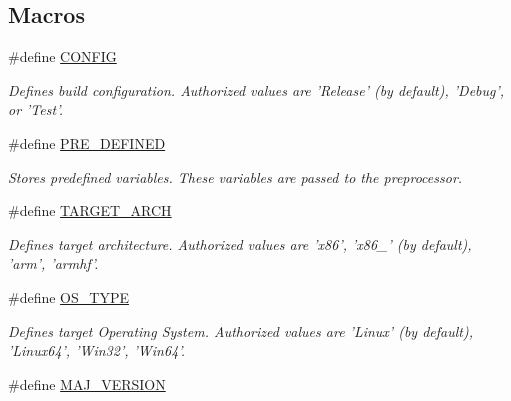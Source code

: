 \subsection*{Macros}
\begin{DoxyCompactItemize}
\item 
\hypertarget{group___build___variables_ga76ea3cf49247a07c54b3db005a3c7f57}{\#define \hyperlink{group___build___variables_ga76ea3cf49247a07c54b3db005a3c7f57}{C\+O\+N\+F\+I\+G}}\label{group___build___variables_ga76ea3cf49247a07c54b3db005a3c7f57}

\begin{DoxyCompactList}\small\item\em Defines build configuration. Authorized values are 'Release' (by default), 'Debug', or 'Test'. \end{DoxyCompactList}\item 
\hypertarget{group___build___variables_gab6ba1c81d5eb93f6cbcd77db8797b5ad}{\#define \hyperlink{group___build___variables_gab6ba1c81d5eb93f6cbcd77db8797b5ad}{P\+R\+E\+\_\+\+D\+E\+F\+I\+N\+E\+D}}\label{group___build___variables_gab6ba1c81d5eb93f6cbcd77db8797b5ad}

\begin{DoxyCompactList}\small\item\em Stores predefined variables. These variables are passed to the preprocessor. \end{DoxyCompactList}\item 
\hypertarget{group___build___variables_ga4039b19fe99a211262e1b3a58314a4cb}{\#define \hyperlink{group___build___variables_ga4039b19fe99a211262e1b3a58314a4cb}{T\+A\+R\+G\+E\+T\+\_\+\+A\+R\+C\+H}}\label{group___build___variables_ga4039b19fe99a211262e1b3a58314a4cb}

\begin{DoxyCompactList}\small\item\em Defines target architecture. Authorized values are 'x86', 'x86\+\_' (by default), 'arm', 'armhf'. \end{DoxyCompactList}\item 
\hypertarget{group___build___variables_gac49cbbb3d31529b75c2490af64e52695}{\#define \hyperlink{group___build___variables_gac49cbbb3d31529b75c2490af64e52695}{O\+S\+\_\+\+T\+Y\+P\+E}}\label{group___build___variables_gac49cbbb3d31529b75c2490af64e52695}

\begin{DoxyCompactList}\small\item\em Defines target Operating System. Authorized values are 'Linux' (by default), 'Linux64', 'Win32', 'Win64'. \end{DoxyCompactList}\item 
\hypertarget{group___build___variables_ga0811dc6fc274184efa103eab807a0989}{\#define \hyperlink{group___build___variables_ga0811dc6fc274184efa103eab807a0989}{M\+A\+J\+\_\+\+V\+E\+R\+S\+I\+O\+N}}\label{group___build___variables_ga0811dc6fc274184efa103eab807a0989}


\end{DoxyCompactItemize}
